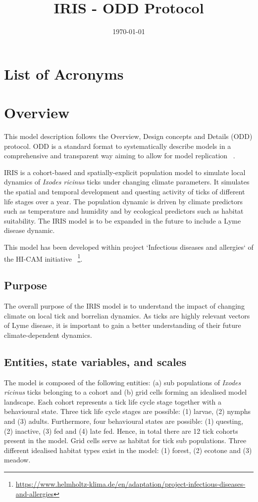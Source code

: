 \documentclass[a4paper, 11pt]{scrartcl}
\title{IRIS - ODD Protocol}
\author{}
\date{\today}
\begin{document}
\maketitle
\tableofcontents

\newpage
\listoffigures
\listoftables

\section*{List of Acronyms}
\begin{acronym}
\end{acronym}


\section{Overview}
This model description follows the Overview, Design concepts and Details (ODD) protocol. ODD is a standard format to systematically
describe models in a comprehensive and transparent way aiming to allow for model replication ~\parencite{Grimm.2010, Grimm.2020}.

IRIS is a cohort-based and spatially-explicit population model to simulate local dynamics of \textit{Ixodes ricinus} ticks under
changing climate parameters. It simulates the spatial and temporal development and questing activity of ticks of different life stages
over a year. The population dynamic is driven by climate predictors such as temperature and humidity and by ecological predictors such
as habitat suitability. The IRIS model is to be expanded in the future to include a Lyme disease dynamic.

This model has been developed within project `Infectious diseases and allergies` of the HI-CAM initiative
~\footnote{\url{https://www.helmholtz-klima.de/en/adaptation/project-infectious-diseases-and-allergies}}.


\subsection{Purpose}
The overall purpose of the IRIS model is to understand the impact of changing climate on local tick and borrelian dynamics. As
ticks are highly relevant vectors of Lyme disease, it is important to gain a better understanding of their future climate-dependent
dynamics.


\subsection{Entities, state variables, and scales}
The model is composed of the following entities: (a) sub populations of \textit{Ixodes ricinus} ticks belonging to a cohort and (b) grid
cells forming an idealised model landscape. Each cohort represents a tick life cycle stage together with a behavioural state. Three tick
life cycle stages are possible: (1) larvae, (2) nymphs and (3) adults. Furthermore, four behavioural states  are possible: (1) questing,
(2) inactive, (3) fed and (4) late fed. Hence, in total there are 12 tick  cohorts present in the model. Grid cells serve as habitat for
tick sub populations. Three different idealised habitat types exist in the model: (1) forest, (2) ecotone and (3) meadow.
\end{document}
